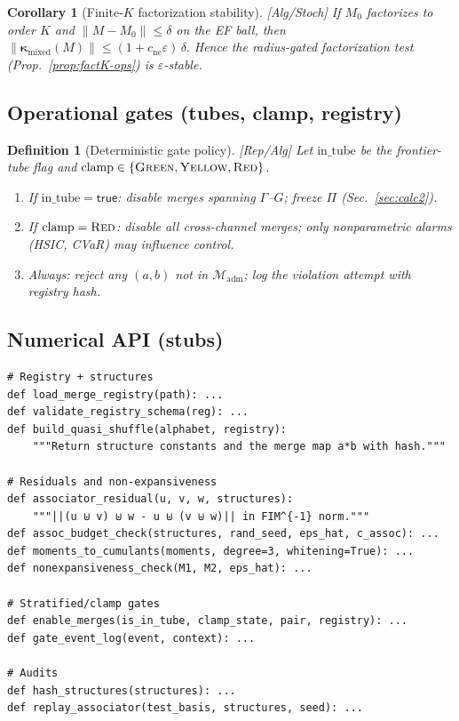 \documentclass[10pt]{article}
\newcommand{\layertag}[1]{\textup{[#1]}}
\newtheorem{definition}{Definition}
\newtheorem{corollary}{Corollary}
\begin{document}
\begin{corollary}[Finite-$K$ factorization stability]\label{cor:fact-stab}
\emph{\layertag{Alg/Stoch}}
If $M_0$ factorizes to order $K$ and $\|M-M_0\|\le\delta$ on the EF ball, then
\(
\|\bm\kappa_{\mathrm{mixed}}(M)\|\le (1+c_{\mathrm{ne}}\varepsilon)\,\delta.
\)
Hence the radius-gated factorization test (Prop.~\ref{prop:factK-ops}) is $\varepsilon$-stable.
\end{corollary}

\subsection*{Operational gates (tubes, clamp, registry)}
\begin{definition}[Deterministic gate policy]\label{def:gates}
\emph{\layertag{Rep/Alg}}
Let $\mathrm{in\_tube}$ be the frontier-tube flag and $\mathrm{clamp}\in\{\textsc{Green},\textsc{Yellow},\textsc{Red}\}$.
\begin{enumerate}[leftmargin=*]
\item If $\mathrm{in\_tube}=\textsf{true}$: disable merges spanning $\Gamma$–$G$; freeze $\Pi$ (Sec.~\ref{sec:calc2}).
\item If $\mathrm{clamp}=\textsc{Red}$: disable \emph{all} cross-channel merges; only nonparametric alarms (HSIC, CVaR) may influence control.
\item Always: reject any $(a,b)$ not in $\mathcal M_{\mathrm{adm}}$; log the violation attempt with registry hash.
\end{enumerate}
\end{definition}

\subsection*{Numerical API (stubs)}
\begin{lstlisting}
# Registry + structures
def load_merge_registry(path): ...
def validate_registry_schema(reg): ...
def build_quasi_shuffle(alphabet, registry):
    """Return structure constants and the merge map a*b with hash."""

# Residuals and non-expansiveness
def associator_residual(u, v, w, structures):
    """||(u ⊎ v) ⊎ w - u ⊎ (v ⊎ w)|| in FIM^{-1} norm."""
def assoc_budget_check(structures, rand_seed, eps_hat, c_assoc): ...
def moments_to_cumulants(moments, degree=3, whitening=True): ...
def nonexpansiveness_check(M1, M2, eps_hat): ...

# Stratified/clamp gates
def enable_merges(is_in_tube, clamp_state, pair, registry): ...
def gate_event_log(event, context): ...

# Audits
def hash_structures(structures): ...
def replay_associator(test_basis, structures, seed): ...
\end{lstlisting}
\end{document}
